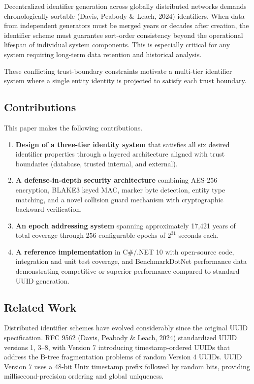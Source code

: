 \documentclass[fleqn,10pt,lineno]{wlpeerj}
\providecommand{\tightlist}{%
  \setlength{\itemsep}{0pt}\setlength{\parskip}{0pt}}
\begin{document}
Decentralized identifier generation across globally distributed networks
demands chronologically sortable (Davis, Peabody \& Leach, 2024)
identifiers. When data from independent generators must be merged years
or decades after creation, the identifier scheme must guarantee
sort-order consistency beyond the operational lifespan of individual
system components. This is especially critical for any system requiring
long-term data retention and historical analysis.

These conflicting trust-boundary constraints motivate a multi-tier
identifier system where a single entity identity is projected to satisfy
each trust boundary.

\subsection{Contributions}\label{contributions}

This paper makes the following contributions.

\begin{enumerate}
\def\labelenumi{\arabic{enumi}.}
\tightlist
\item
  \textbf{Design of a three-tier identity system} that satisfies all six
  desired identifier properties through a layered architecture aligned
  with trust boundaries (database, trusted internal, and external).
\item
  \textbf{A defense-in-depth security architecture} combining AES-256
  encryption, BLAKE3 keyed MAC, marker byte detection, entity type
  matching, and a novel collision guard mechanism with cryptographic
  backward verification.
\item
  \textbf{An epoch addressing system} spanning approximately 17,421
  years of total coverage through 256 configurable epochs of \(2^{31}\)
  seconds each.
\item
  \textbf{A reference implementation} in C\#/.NET 10 with open-source
  code, integration and unit test coverage, and BenchmarkDotNet
  performance data demonstrating competitive or superior performance
  compared to standard UUID generation.
\end{enumerate}

\newpage

\subsection{Related Work}\label{related-work}

Distributed identifier schemes have evolved considerably since the
original UUID specification. RFC 9562 (Davis, Peabody \& Leach, 2024)
standardized UUID versions 1, 3--8, with Version 7 introducing
timestamp-ordered UUIDs that address the B-tree fragmentation problems
of random Version 4 UUIDs. UUID Version 7 uses a 48-bit Unix timestamp
prefix followed by random bits, providing millisecond-precision ordering
and global uniqueness.
\end{document}

